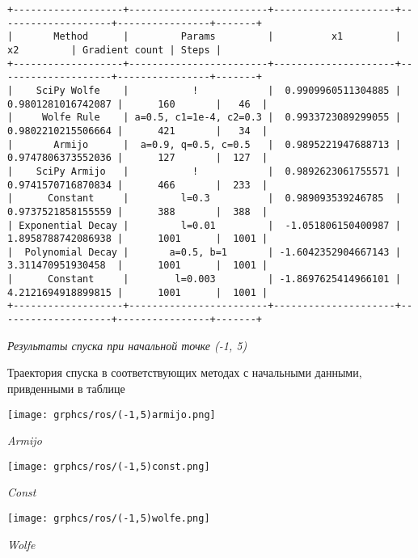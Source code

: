 \documentclass{article}
\begin{document}
\begin{center}
{ \scriptsize
\begin{verbatim}
+-------------------+------------------------+---------------------+--------------------+----------------+-------+
|       Method      |         Params         |          x1         |         x2         | Gradient count | Steps |
+-------------------+------------------------+---------------------+--------------------+----------------+-------+
|    SciPy Wolfe    |           !            |  0.9909960511304885 | 0.9801281016742087 |      160       |   46  |
|     Wolfe Rule    | a=0.5, c1=1e-4, c2=0.3 |  0.9933723089299055 | 0.9802210215506664 |      421       |   34  |
|       Armijo      |  a=0.9, q=0.5, c=0.5   |  0.9895221947688713 | 0.9747806373552036 |      127       |  127  |
|    SciPy Armijo   |           !            |  0.9892623061755571 | 0.9741570716870834 |      466       |  233  |
|      Constant     |         l=0.3          |  0.989093539246785  | 0.9737521858155559 |      388       |  388  |
| Exponential Decay |         l=0.01         |  -1.051806150400987 | 1.8958788742086938 |      1001      |  1001 |
|  Polynomial Decay |       a=0.5, b=1       | -1.6042352904667143 | 3.311470951930458  |      1001      |  1001 |
|      Constant     |        l=0.003         | -1.8697625414966101 | 4.2121694918899815 |      1001      |  1001 |
+-------------------+------------------------+---------------------+--------------------+----------------+-------+
\end{verbatim}
}
{ \it Результаты спуска при начальной точке (-1, 5)}
\end{center}

Траектория спуска в соответствующих методах с начальными данными, привденными в таблице

\begin{center}
    \texttt{[image: grphcs/ros/(-1,5)armijo.png]}

    { \it Armijo}
\end{center}

\begin{center}
    \texttt{[image: grphcs/ros/(-1,5)const.png]}

    { \it Const}
\end{center}

\begin{center}
    \texttt{[image: grphcs/ros/(-1,5)wolfe.png]}

    { \it Wolfe}
\end{center}
\end{document}
